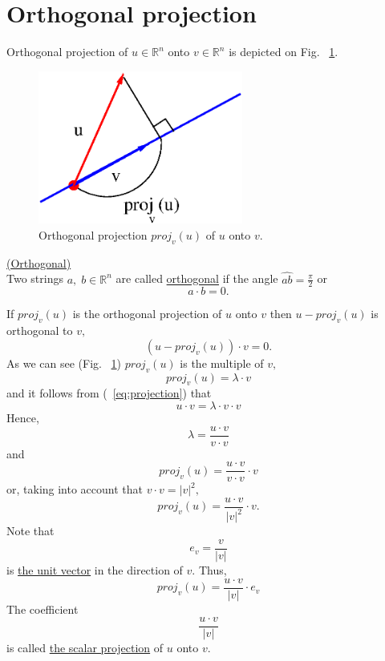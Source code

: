 \documentclass[color=black,11pt]{elegantpaper}
\begin{document}
\section{Orthogonal projection}
Orthogonal projection of $u\in \mathbb{R}^n$ onto $v\in \mathbb{R}^n$ is depicted on Fig. ~\ref{fig:orthogonalProjection}.
\begin{figure}[htbp]
  \centering
  \includegraphics[width=0.6\textwidth]{xfig_stuff/orthogonalProjection.eps}
  \caption{Orthogonal projection $proj_v(u)$ of $u$ onto $v$.}
  \label{fig:orthogonalProjection}
\end{figure}
\begin{definition}
\href{https://mathworld.wolfram.com/Orthogonal.html}{(Orthogonal)}\\
Two strings $a,\;b\in \mathbb{R}^n$ are called \href{https://mathworld.wolfram.com/Orthogonal.html}{orthogonal} if  the angle $\hat{ab}=\frac{\pi}{2}$ or
$$
a \cdot b = 0.
$$
\end{definition}
If $proj_v(u)$ is the orthogonal projection of $u$ onto $v$ then $u- proj_v(u)$ is orthogonal to $v,$
\begin{equation}
\label{eq:projection}
(u- proj_v(u))\cdot v = 0.
\end{equation}
As we can see (Fig. ~\ref{fig:orthogonalProjection}) $proj_v(u)$ is the multiple of $v,$
$$
proj_v(u) = \lambda \cdot v
$$
and it follows from (~\ref{eq:projection}) that
$$
u\cdot v = \lambda \cdot v\cdot v
$$ 
Hence,
$$
\lambda = \frac{u\cdot v}{v\cdot v}
$$
and 
$$
proj_v(u) = \frac{u\cdot v}{v\cdot v} \cdot v
$$
or, taking into account that $v\cdot v=|v|^2,$
$$
proj_v(u) = \frac{u\cdot v}{|v|^2} \cdot v.
$$
Note that 
$$
e_v=\frac{v}{|v|}
$$
is \href{https://en.wikipedia.org/wiki/Unit_vector}{the unit vector} in the direction of $v.$
Thus,
$$
proj_v(u) = \frac{u\cdot v}{|v|} \cdot e_v
$$
The coefficient
$$
\frac{u\cdot v}{|v|}
$$
is called \href{https://en.wikipedia.org/wiki/Scalar_projection}{the scalar projection} of $u$ onto $v.$\\
\end{document}
